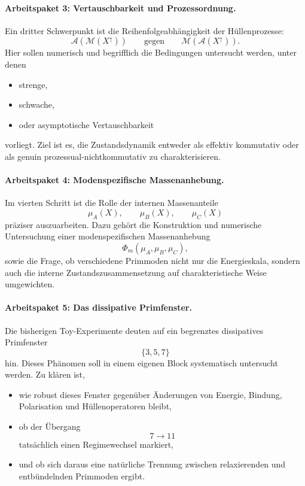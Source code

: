 \documentclass[11pt,a4paper]{article}
\theoremstyle{definition}
\begin{document}
\paragraph{Arbeitspaket 3: Vertauschbarkeit und Prozessordnung.}
Ein dritter Schwerpunkt ist die Reihenfolgeabhängigkeit der Hüllenprozesse:
\[
\mathcal A(\mathcal M(X^\uparrow))
\qquad\text{gegen}\qquad
\mathcal M(\mathcal A(X^\uparrow)).
\]
Hier sollen numerisch und begrifflich die Bedingungen untersucht werden, unter denen
\begin{itemize}
	\item strenge,
	\item schwache,
	\item oder asymptotische Vertauschbarkeit
\end{itemize}
vorliegt. Ziel ist es, die Zustandsdynamik entweder als effektiv kommutativ oder als genuin prozessual-nichtkommutativ zu charakterisieren.

\paragraph{Arbeitspaket 4: Modenspezifische Massenanhebung.}
Im vierten Schritt ist die Rolle der internen Massenanteile
\[
\mu_A(X),\qquad \mu_B(X),\qquad \mu_C(X)
\]
präziser auszuarbeiten. Dazu gehört die Konstruktion und numerische Untersuchung einer modenspezifischen Massenanhebung
\[
\Phi_m(\mu_A,\mu_B,\mu_C),
\]
sowie die Frage, ob verschiedene Primmoden nicht nur die Energieskala, sondern auch die interne Zustandszusammensetzung auf charakteristische Weise umgewichten.

\paragraph{Arbeitspaket 5: Das dissipative Primfenster.}
Die bisherigen Toy-Experimente deuten auf ein begrenztes dissipatives Primfenster
\[
\{3,5,7\}
\]
hin. Dieses Phänomen soll in einem eigenen Block systematisch untersucht werden. Zu klären ist,
\begin{itemize}
	\item wie robust dieses Fenster gegenüber Änderungen von Energie, Bindung, Polarisation und Hüllenoperatoren bleibt,
	\item ob der Übergang
	\[
	7\longrightarrow 11
	\]
	tatsächlich einen Regimewechsel markiert,
	\item und ob sich daraus eine natürliche Trennung zwischen relaxierenden und entbündelnden Primmoden ergibt.
\end{itemize}
\end{document}
